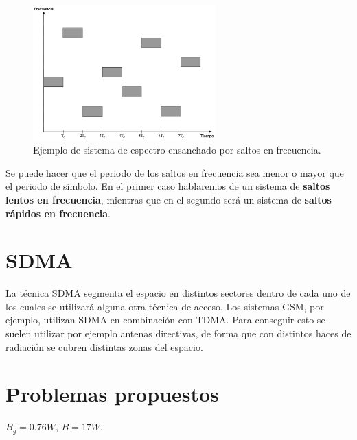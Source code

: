 \documentclass[es,apuntes]{uah}
\begin{document}
\begin{figure}[h!]
	\centering\includegraphics[width=7cm]{./Figuras/FrequencyHopping}
	\caption{Ejemplo de sistema de espectro ensanchado por saltos en frecuencia.}
	\label{fig:FrequencyHopping}
\end{figure}

Se puede hacer que el periodo de los saltos en frecuencia sea menor o mayor que el periodo de símbolo. En el primer caso hablaremos de un sistema de {\bf saltos lentos en frecuencia}, mientras que en el segundo será un sistema de {\bf saltos rápidos en frecuencia}. 




\section{SDMA}

La técnica SDMA segmenta el espacio en distintos sectores dentro de cada uno de los cuales se utilizará alguna otra técnica de acceso. Los sistemas GSM, por ejemplo, utilizan SDMA en combinación con TDMA. Para conseguir esto se suelen utilizar por ejemplo antenas directivas, de forma que con distintos haces de radiación se cubren distintas zonas del espacio. 



\section{Problemas propuestos}



	{$B_g = 0.76 W$, $B=17W$.}{}{}
\end{document}
